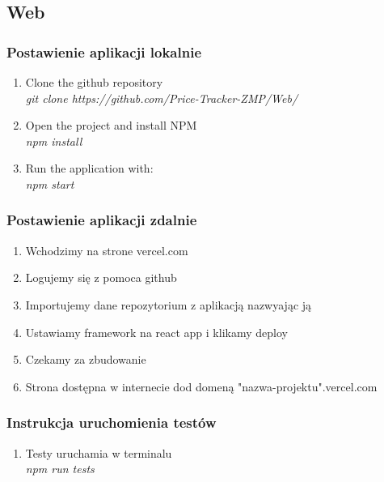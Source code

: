 \documentclass{article}
\begin{document}
    \subsection{Web}
        \subsubsection{Postawienie aplikacji lokalnie}
        \begin{enumerate}
            \item Clone the github repository\\
                        \emph{git clone https://github.com/Price-Tracker-ZMP/Web/} \\
            \item Open the project and install NPM\\
              \emph{npm install} \\
            \item Run the application with:\\
                \emph{npm start} \\
        \end{enumerate}
        
        \subsubsection{Postawienie aplikacji zdalnie}
         \begin{enumerate}
            \item Wchodzimy na strone vercel.com\\
            \item Logujemy się z pomoca github\\
            \item Importujemy dane repozytorium z aplikacją nazwyając ją\\
            \item Ustawiamy framework na react app i klikamy deploy\\
            \item Czekamy za zbudowanie\\
            \item Strona dostępna w internecie dod domeną "nazwa-projektu".vercel.com\\
        \end{enumerate}
        
        
        \subsubsection{Instrukcja uruchomienia testów}
         \begin{enumerate}
            \item Testy uruchamia w terminalu\\
            \emph{npm run tests} \\
        \end{enumerate}
\end{document}
